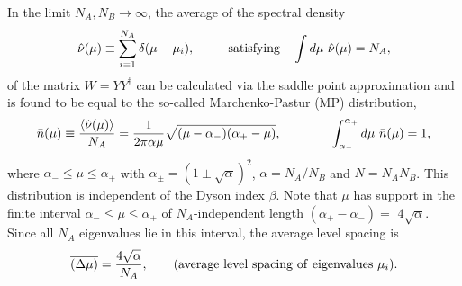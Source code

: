 \documentclass[aps,prb,preprint,onecolumn,amsmath,amssymb,superscriptaddress,eqsecnum,floatfix,scrartcl]{revtex4-1}
\begin{document}
 In the limit $N_A,N_B\to\infty$, the average of the spectral density
\begin{eqnarray}
\label{DEFSpectralDensityMu}
{\hat \nu} (\mu) \equiv \sum_{i=1}^{N_A} \delta(\mu - \mu_i),
\qquad \ \  {\rm satisfying} \quad \int d \mu \  {\hat \nu}(\mu) = N_A,
\end{eqnarray}
 of the matrix $W=Y Y^\dagger$
can be calculated via the saddle point approximation and is 
found to be equal to the so-called Marchenko-Pastur (MP) distribution\cite{loggas},
\begin{eqnarray}
\bar{n}(\mu)\equiv
{\langle
{\hat \nu} (\mu) 
\rangle\over N_A}
=\frac{1}{2\pi\alpha \mu}\sqrt{(\mu-\alpha_-)(\alpha_+-\mu)},
\qquad  \qquad \int_{\alpha_-}^{\alpha_+} d\mu \  {\bar n}(\mu) =1,
\label{mp_dis}
\end{eqnarray}
where $\alpha_-\leq \mu \leq \alpha_+$ with $\alpha_{\pm }=(1\pm \sqrt{\alpha})^2$, $\alpha=N_A/N_B$ and $N=N_A N_B$. This distribution is independent of the Dyson  index $\beta$.
Note that $\mu$ has support in the finite interval $\alpha_- \leq \mu \leq \alpha_+$ of $N_A$-independent length
$(\alpha_+-\alpha_-)= $ $4 \sqrt{\alpha}$. Since all $N_A$ eigenvalues lie in this interval, the average level spacing is
\begin{eqnarray}
\label{AverageLevelSpacingMu}
\overline{\left (\Delta \mu\right )} 
=
{4 \sqrt{\alpha}
\over N_A},
\qquad ({\rm average \ level \ spacing \ of \ eigenvalues} \ \mu_i).
\end{eqnarray}

\end{document}
